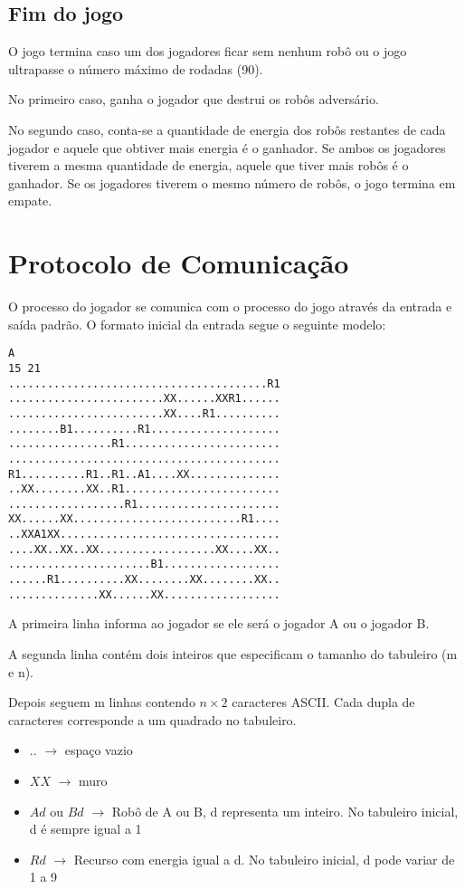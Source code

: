 \documentclass[a4paper,11pt]{article}
\begin{document}
\subsection{Fim do jogo}
O jogo termina caso um dos jogadores ficar sem nenhum robô ou o jogo ultrapasse o número máximo de rodadas (90).

No primeiro caso, ganha o jogador que destrui os robôs adversário.

No segundo caso, conta-se a quantidade de energia dos robôs restantes de cada jogador e aquele que obtiver mais energia é o ganhador. Se ambos os jogadores tiverem a mesma quantidade de energia, aquele que tiver mais robôs é o ganhador. Se os jogadores tiverem o mesmo número de robôs, o jogo termina em empate.

\section{Protocolo de Comunicação}

O processo do jogador se comunica com o processo do jogo através da entrada e saída padrão. O formato inicial da entrada segue o seguinte modelo:
\begin{verbatim}
A
15 21
........................................R1
........................XX......XXR1......
........................XX....R1..........
........B1..........R1....................
................R1........................
..........................................
R1..........R1..R1..A1....XX..............
..XX........XX..R1........................
..................R1......................
XX......XX..........................R1....
..XXA1XX..................................
....XX..XX..XX..................XX....XX..
......................B1..................
......R1..........XX........XX........XX..
..............XX......XX..................
\end{verbatim}

A primeira linha informa ao jogador se ele será o jogador A ou o jogador B.

A segunda linha contém dois inteiros que especificam o tamanho do tabuleiro (m e n).

Depois seguem m linhas contendo $n \times 2$ caracteres ASCII. Cada dupla de caracteres corresponde a um quadrado no tabuleiro.

\begin{itemize}
\item{$..$ $\rightarrow$ espaço vazio}
\item{$XX$ $\rightarrow$ muro}
\item{$Ad$ ou $Bd$ $\rightarrow$ Robô de A ou B, d representa um inteiro. No tabuleiro inicial, d é sempre igual a 1 }
\item{$Rd$ $\rightarrow$ Recurso com energia igual a d. No tabuleiro inicial, d pode variar de 1 a 9}
\end{itemize}
\end{document}
